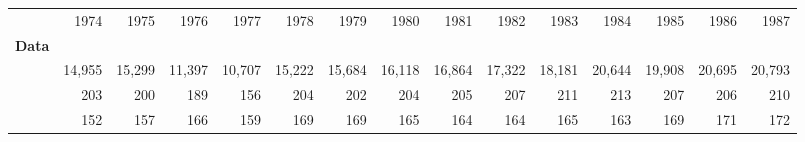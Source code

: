 \begin{tabular}{lllllllllllllll}
\cline{1-15}
\multicolumn{1}{c}{} &
  \multicolumn{1}{|r}{1974} &
  \multicolumn{1}{r}{1975} &
  \multicolumn{1}{r}{1976} &
  \multicolumn{1}{r}{1977} &
  \multicolumn{1}{r}{1978} &
  \multicolumn{1}{r}{1979} &
  \multicolumn{1}{r}{1980} &
  \multicolumn{1}{r}{1981} &
  \multicolumn{1}{r}{1982} &
  \multicolumn{1}{r}{1983} &
  \multicolumn{1}{r}{1984} &
  \multicolumn{1}{r}{1985} &
  \multicolumn{1}{r}{1986} &
  \multicolumn{1}{r}{1987} \\
\cline{1-15}
\multicolumn{1}{l}{\textbf{Data}} &
  \multicolumn{1}{|r}{} &
  \multicolumn{1}{r}{} &
  \multicolumn{1}{r}{} &
  \multicolumn{1}{r}{} &
  \multicolumn{1}{r}{} &
  \multicolumn{1}{r}{} &
  \multicolumn{1}{r}{} &
  \multicolumn{1}{r}{} &
  \multicolumn{1}{r}{} &
  \multicolumn{1}{r}{} &
  \multicolumn{1}{r}{} &
  \multicolumn{1}{r}{} &
  \multicolumn{1}{r}{} &
  \multicolumn{1}{r}{} \\
\multicolumn{1}{l}{\hspace{1em}{$\#$ obs.}} &
  \multicolumn{1}{|r}{14,955} &
  \multicolumn{1}{r}{15,299} &
  \multicolumn{1}{r}{11,397} &
  \multicolumn{1}{r}{10,707} &
  \multicolumn{1}{r}{15,222} &
  \multicolumn{1}{r}{15,684} &
  \multicolumn{1}{r}{16,118} &
  \multicolumn{1}{r}{16,864} &
  \multicolumn{1}{r}{17,322} &
  \multicolumn{1}{r}{18,181} &
  \multicolumn{1}{r}{20,644} &
  \multicolumn{1}{r}{19,908} &
  \multicolumn{1}{r}{20,695} &
  \multicolumn{1}{r}{20,793} \\
\multicolumn{1}{l}{\hspace{1em}{$\#$ sectors}} &
  \multicolumn{1}{|r}{203} &
  \multicolumn{1}{r}{200} &
  \multicolumn{1}{r}{189} &
  \multicolumn{1}{r}{156} &
  \multicolumn{1}{r}{204} &
  \multicolumn{1}{r}{202} &
  \multicolumn{1}{r}{204} &
  \multicolumn{1}{r}{205} &
  \multicolumn{1}{r}{207} &
  \multicolumn{1}{r}{211} &
  \multicolumn{1}{r}{213} &
  \multicolumn{1}{r}{207} &
  \multicolumn{1}{r}{206} &
  \multicolumn{1}{r}{210} \\
\multicolumn{1}{l}{\hspace{1em}{$\#$ origin countries}} &
  \multicolumn{1}{|r}{152} &
  \multicolumn{1}{r}{157} &
  \multicolumn{1}{r}{166} &
  \multicolumn{1}{r}{159} &
  \multicolumn{1}{r}{169} &
  \multicolumn{1}{r}{169} &
  \multicolumn{1}{r}{165} &
  \multicolumn{1}{r}{164} &
  \multicolumn{1}{r}{164} &
  \multicolumn{1}{r}{165} &
  \multicolumn{1}{r}{163} &
  \multicolumn{1}{r}{169} &
  \multicolumn{1}{r}{171} &
  \multicolumn{1}{r}{172} \\

\end{tabular}

